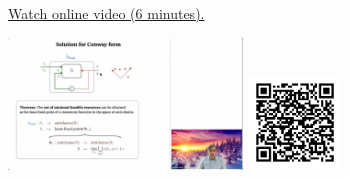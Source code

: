 
\begin{minipage}{10cm}
    \href{https://act4e-spring21.netlify.app/videos/spring2021-functorial-comp-b:solving-queries:solving-loop.html}{Watch online video (6 minutes).}
        
    \href{https://act4e-spring21.netlify.app/videos/spring2021-functorial-comp-b:solving-queries:solving-loop.html}{\includegraphics[height=3.5cm]{spring2021-functorial-comp-b:solving-queries:solving-loop/thumbnails.jpg}}
    \href{https://act4e-spring21.netlify.app/videos/spring2021-functorial-comp-b:solving-queries:solving-loop.html}{\includegraphics[height=2.5cm]{spring2021-functorial-comp-b:solving-queries:solving-loop/qrcode.png}}
\end{minipage}
